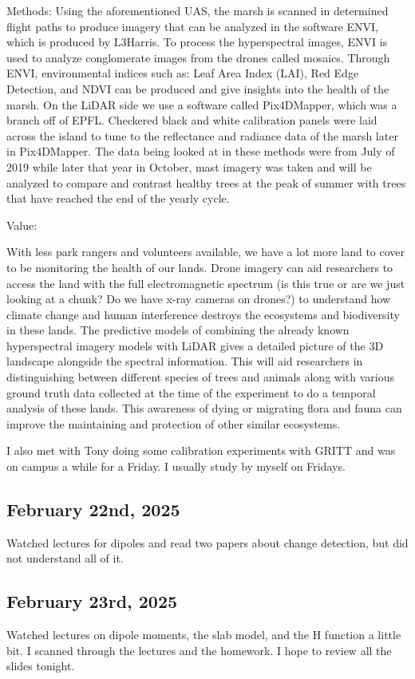 \documentclass{article}
\begin{document}
Methods: 
Using the aforementioned UAS, the marsh is scanned in determined flight paths to produce imagery that can be analyzed in the software ENVI, which is produced by L3Harris. To process the hyperspectral images, ENVI is used to analyze conglomerate images from the drones called mosaics. Through ENVI, environmental indices such as: Leaf Area Index (LAI), Red Edge Detection, and NDVI can be produced and give insights into the health of the marsh. On the LiDAR side we use a software called Pix4DMapper, which was a branch off of EPFL. Checkered black and white calibration panels were laid across the island to tune to the reflectance and radiance data of the marsh later in Pix4DMapper. The data being looked at in these methods were from July of 2019 while later that year in October, mast imagery was taken and will be analyzed to compare and contrast healthy trees at the peak of summer with trees that have reached the end of the yearly cycle. 


Value:

With less park rangers and volunteers available, we have a lot more land to cover to be monitoring the health of our lands. Drone imagery can aid researchers to access the land with the full electromagnetic spectrum (is this true or are we just looking at a chunk? Do we have x-ray cameras on drones?) to understand how climate change and human interference destroys the ecosystems and biodiversity in these lands. The predictive models of combining the already known hyperspectral imagery models with LiDAR gives a detailed picture of the 3D landscape alongside the spectral information. This will aid researchers in distinguishing between different species of trees and animals along with various ground truth data collected at the time of the experiment to do a temporal analysis of these lands. This awareness of dying or migrating flora and fauna can improve the maintaining and protection of other similar ecosystems.


I also met with Tony doing some calibration experiments with GRITT and was on campus a while for a Friday. I usually study by myself on Fridays. 

\subsection{February 22nd, 2025}
Watched lectures for dipoles and read two papers about change detection, but did not understand all of it. 

\subsection{February 23rd, 2025}
Watched lectures on dipole moments, the slab model, and the H function a little bit. I scanned through the lectures and the homework. I hope to review all the slides tonight.
\end{document}
